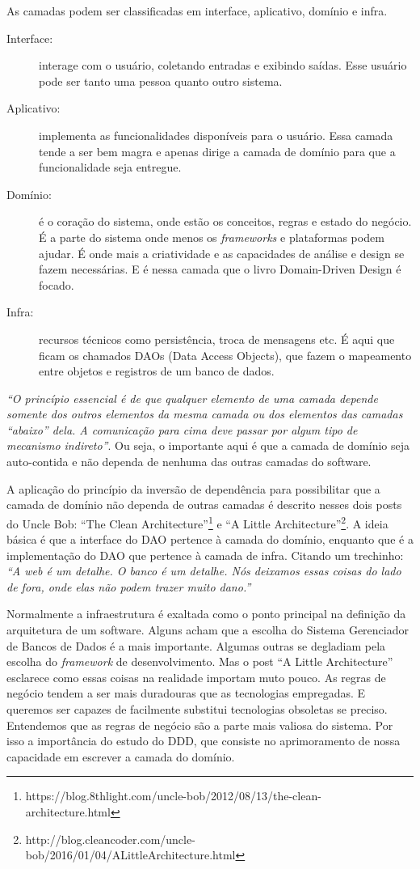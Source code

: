 \documentclass[a4paper, 12pt]{article}
\newcommand{\citacao}[1]{\emph{``#1''}}
\begin{document}
As camadas podem ser classificadas em interface, aplicativo, domínio e infra.

\begin{description}
\item [Interface:] interage com o usuário, coletando entradas e exibindo saídas. Esse usuário pode ser tanto uma pessoa quanto outro sistema.
\item [Aplicativo:] implementa as funcionalidades disponíveis para o usuário. Essa camada tende a ser bem magra e apenas dirige a camada de domínio para que a funcionalidade seja entregue.
\item [Domínio:] é o coração do sistema, onde estão os conceitos, regras e estado do negócio. É a parte do sistema onde menos os \emph{frameworks} e plataformas podem ajudar. É onde mais a criatividade e as capacidades de análise e design se fazem necessárias. E é nessa camada que o livro Domain-Driven Design é focado.
\item [Infra:] recursos técnicos como persistência, troca de mensagens etc. É aqui que ficam os chamados DAOs (Data Access Objects), que fazem o mapeamento entre objetos e registros de um banco de dados.
\end{description}

\citacao{O princípio essencial é de que qualquer elemento de uma camada depende somente dos outros elementos da mesma camada ou dos elementos das camadas ``abaixo'' dela. A comunicação para cima deve passar por algum tipo de mecanismo indireto}. Ou seja, o importante aqui é que a camada de domínio seja auto-contida e não dependa de nenhuma das outras camadas do software.

A aplicação do princípio da inversão de dependência para possibilitar que a camada de domínio não dependa de outras camadas é descrito nesses dois posts do Uncle Bob: ``The Clean Architecture''\footnote{https://blog.8thlight.com/uncle-bob/2012/08/13/the-clean-architecture.html} e ``A Little Architecture''\footnote{http://blog.cleancoder.com/uncle-bob/2016/01/04/ALittleArchitecture.html}. A ideia básica é que a interface do DAO pertence à camada do domínio, enquanto que é a implementação do DAO que pertence à camada de infra. Citando um trechinho: \citacao{A web é um detalhe. O banco é um detalhe. Nós deixamos essas coisas do lado de fora, onde elas não podem trazer muito dano.}

Normalmente a infraestrutura é exaltada como o ponto principal na definição da arquitetura de um software. Alguns acham que a escolha do Sistema Gerenciador de Bancos de Dados é a mais importante. Algumas outras se degladiam pela escolha do \emph{framework} de desenvolvimento. Mas o post ``A Little Architecture'' esclarece como essas coisas na realidade importam muto pouco. As regras de negócio tendem a ser mais duradouras que as tecnologias empregadas. E queremos ser capazes de facilmente substitui tecnologias obsoletas se preciso. Entendemos que as regras de negócio são a parte mais valiosa do sistema. Por isso a importância do estudo do DDD, que consiste no aprimoramento de nossa capacidade em escrever a camada do domínio.
\end{document}
